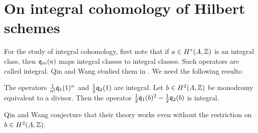 

\section{On integral cohomology of Hilbert schemes}\label{basisHilb2}

For the study of integral cohomology, first note that if $a \in H^*(A,\mathbb{Z})$ is an integral class, then $\mathfrak{q}_{m}(a) $ maps integral classes to integral classes. Such operators are called integral. Qin and Wang studied them in \cite{QinWang}. We need the following results:

\begin{lemma} \cite{QinWang}\label{IntegralOperators}
The operators $\frac{1}{n!}\mathfrak{q}_1(1)^n$ and $\frac{1}{2}\mathfrak{q}_2(1) $ are integral.
Let $b\in H^2(A,\mathbb{Z})$ be monodromy equivalent to a divisor. Then the operator $\frac{1}{2}\mathfrak{q}_1(b)^2 - \frac{1}{2}\mathfrak{q}_2(b)$ is integral. 
\end{lemma}
\begin{remark}
Qin and Wang \cite[Thm 1.1 et seq.]{QinWang} conjecture that their theory works even without the restriction on $b\in H^2(A,\mathbb{Z})$. 
\end{remark}

